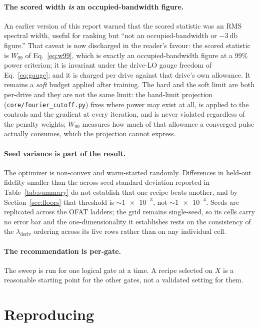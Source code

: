 \documentclass[11pt]{article}
\newcommand{\lamd}{\lambda_{\mathrm{deriv}}}
\begin{document}
\paragraph{The scored width \emph{is} an occupied-bandwidth figure.}
An earlier version of this report warned that the scored statistic was an RMS spectral width,
useful for ranking but ``not an occupied-bandwidth or $-\SI{3}{\decibel}$ figure.'' That caveat
is now discharged in the reader's favour: the scored statistic is $W_{99}$ of Eq.~\eqref{eq:w99},
which is exactly an occupied-bandwidth figure at a 99\% power criterion; it is invariant under the
drive-LO gauge freedom of Eq.~\eqref{eq:gauge}; and it is charged per drive against that drive's
own allowance. It remains a \emph{soft} budget applied after training. The hard and the soft limit
are both per-drive and they are not the same limit: the band-limit projection
(\texttt{core/fourier\_cutoff.py}) fixes where power may exist at all, is applied to the controls
and the gradient at every iteration, and is never violated regardless of the penalty weights;
$W_{99}$ measures how much of that allowance a converged pulse actually consumes, which the
projection cannot express.

\paragraph{Seed variance is part of the result.}
The optimizer is non-convex and warm-started randomly. Differences in held-out fidelity smaller
than the across-seed standard deviation reported in Table~\ref{tab:summary} do not establish that
one recipe beats another, and by Section~\ref{sec:floors} that threshold is
$\sim\!\num{1e-3}$, not $\sim\!\num{1e-4}$. Seeds are replicated across the OFAT ladders; the
grid remains single-seed, so its cells carry no error bar and the one-dimensionality it
establishes rests on the consistency of the $\lamd$ ordering across its five rows rather than on
any individual cell.

\paragraph{The recommendation is per-gate.}
The sweep is run for one logical gate at a time. A recipe selected on $X$ is a reasonable
starting point for the other gates, not a validated setting for them.

\section{Reproducing}
\label{sec:repro}
\end{document}
